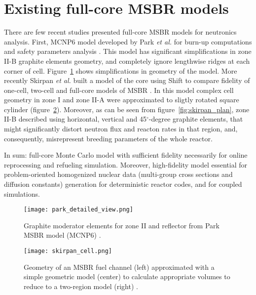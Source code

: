 \section{Existing full-core MSBR models}
There are few recent studies presented full-core \gls{MSBR} models for neutronics analysis. First, MCNP6 model developed by Park \emph{et al.} for burn-up computations and safety parameters analysis \cite{park_whole_2015}. This model has significant simplifications in zone II-B graphite elements geometry, and completely ignore lengthwise ridges at each corner of cell. Figure~\ref{fig:park} shows simplifications in geometry of the model.  More recently Skirpan \emph{et al.} built a model of the core using Shift \cite{pandya_implementation_2016} to compare fidelity of one-cell, two-cell and full-core models of \gls{MSBR} \cite{skirpan_fuel_2017}. In this model complex cell geometry in zone I and zone II-A were approximated to sligtly rotated square cylinder (figure~\ref{fig:skirpan_cell}). Moreover, as can be seen from figure~\ref{fig:skirpan_plan}, zone II-B described using horizontal, vertical and 45$^\circ$-degree graphite elements, that might significantly distort neutron flux and reacton rates in that region, and, consequently, misrepresent breeding parameters of the whole reactor.

In sum: full-core Monte Carlo model with sufficient fidelity necessarily for online reprocessing and refueling simulation. Moreover, high-fidelity model essential for problem-oriented homogenized nuclear data (multi-group cross sections and diffusion constants) generation for deterministic reactor codes, and for coupled simulations.

\begin{figure}[hbp!] %
  \centering
  \vspace{-0.3em}
  \texttt{[image: park\_detailed\_view.png]}
  \caption{Graphite moderator elements  for zone II and reflector from Park \gls{MSBR} model (MCNP6) \cite{park_whole_2015}.}
  \vspace{-0.6em}
  \label{fig:park}
\end{figure}
\FloatBarrier

\begin{figure}[htp!] %
  \centering
  \vspace{-0.3em}
  \texttt{[image: skirpan\_cell.png]}
  \caption{Geometry of an MSBR fuel channel (left) approximated with a simple geometric model (center) to calculate appropriate volumes to reduce to a two-region model (right) \cite{skirpan_fuel_2017}.}
  \vspace{-0.6em}
  \label{fig:skirpan_cell}
\end{figure}

